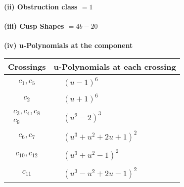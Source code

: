 \documentclass[1p]{elsarticle_modified}
\theoremstyle{definition}
\begin{document}
\flushleft \textbf{(ii) Obstruction class $= 1$}\\~\\
\flushleft \textbf{(iii) Cusp Shapes $= 4 b-20$}\\~\\
\newpage\renewcommand{\arraystretch}{1}
\flushleft \textbf{(iv) u-Polynomials at the component}\newline \\
\begin{tabular}{m{50pt}|m{274pt}}
Crossings & \hspace{64pt}u-Polynomials at each crossing \\
\hline $$\begin{aligned}c_{1},c_{5}\end{aligned}$$&$\begin{aligned}
&(u-1)^6
\end{aligned}$\\
\hline $$\begin{aligned}c_{2}\end{aligned}$$&$\begin{aligned}
&(u+1)^6
\end{aligned}$\\
\hline $$\begin{aligned}c_{3},c_{4},c_{8}\\c_{9}\end{aligned}$$&$\begin{aligned}
&(u^2-2)^3
\end{aligned}$\\
\hline $$\begin{aligned}c_{6},c_{7}\end{aligned}$$&$\begin{aligned}
&(u^3+u^2+2 u+1)^2
\end{aligned}$\\
\hline $$\begin{aligned}c_{10},c_{12}\end{aligned}$$&$\begin{aligned}
&(u^3+u^2-1)^2
\end{aligned}$\\
\hline $$\begin{aligned}c_{11}\end{aligned}$$&$\begin{aligned}
&(u^3- u^2+2 u-1)^2
\end{aligned}$\\
\hline
\end{tabular}\\~\\
\end{document}
